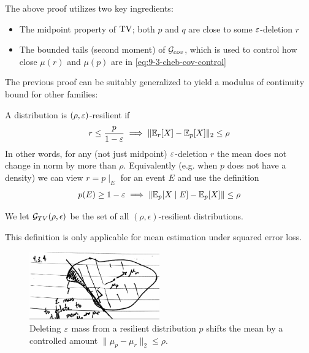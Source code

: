 The above proof utilizes two key ingredients:
\begin{itemize}
    \item The midpoint property of $\operatorname{TV}$; both $p$ and $q$ are close to some $\varepsilon$-deletion $r$
    \item The bounded tails (second moment) of $\mathcal{G}_{cov}$, which is used to control how close $\mu(r)$
    and $\mu(p)$ are in \cref{eq:9-3-cheb-cov-control}
\end{itemize}

The previous proof can be suitably generalized to yield a modulus of continuity bound
for other families:
\begin{definition}\label{def:resilience}
    A distribution is $(\rho, \varepsilon)$-resilient if
    \begin{align}\label{eq:resilience-property}
        r \leq \frac{p}{1 - \varepsilon} \implies \|\mathbb{E}_r[X] - \mathbb{E}_p[X]\|_2 \leq \rho
    \end{align}
    In other words, for any (not just midpoint) $\varepsilon$-deletion $r$ the mean does not change in
    norm by more than $\rho$. Equivalently (e.g. when $p$ does not have a density) we can view $r = p \mid_E$
    for an event $E$ and use the definition
    \begin{align}
        p(E) \geq 1 - \varepsilon \implies \|\mathbb{E}_p[X \mid E] - \mathbb{E}_p[X]\| \leq \rho
    \end{align}
    
    We let $\mathcal{G}_{TV}(\rho, \epsilon)$ be the set of all $(\rho, \epsilon)$-resilient distributions.
\end{definition}

\begin{remark}
    This definition is only applicable for mean estimation under squared error loss.
\end{remark}

\begin{figure}[H]
    \centering
    \includegraphics[width=0.5\textwidth]{figures/9-3-4.png}
    \caption{Deleting $\varepsilon$ mass from a resilient distribution $p$ shifts the mean by a controlled
    amount $\|\mu_p - \mu_r\|_2 \leq \rho$.}
\end{figure}

